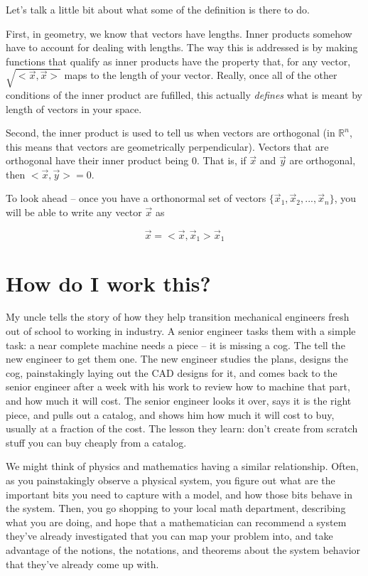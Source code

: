 \documentclass[
]{book}
\begin{document}
Let's talk a little bit about what some of the definition is there to do.

First, in geometry, we know that vectors have lengths. Inner products somehow have to account for dealing with lengths. The way this is addressed is by making functions that qualify as inner products have the property that, for any vector, \(\sqrt{<\vec{x},\vec{x}>}\) maps to the length of your vector. Really, once all of the other conditions of the inner product are fufilled, this actually \emph{defines} what is meant by length of vectors in your space.

Second, the inner product is used to tell us when vectors are orthogonal (in \(\mathbb{R}^n\), this means that vectors are geometrically perpendicular). Vectors that are orthogonal have their inner product being 0. That is, if \(\vec{x}\) and \(\vec{y}\) are orthogonal, then \(<\vec{x},\vec{y}> = 0\).

To look ahead -- once you have a orthonormal set of vectors \(\{\vec{x}_{1},\vec{x}_{2}, ..., \vec{x}_{n}\}\), you will be able to write any vector \(\vec{x}\) as

\[\vec{x} = <\vec{x}, \vec{x}_{1}> \vec{x}_{1} \]

\hypertarget{how-do-i-work-this}{%
\chapter{How do I work this?}\label{how-do-i-work-this}}

My uncle tells the story of how they help transition mechanical engineers fresh out of school to working in industry. A senior engineer tasks them with a simple task: a near complete machine needs a piece -- it is missing a cog. The tell the new engineer to get them one. The new engineer studies the plans, designs the cog, painstakingly laying out the CAD designs for it, and comes back to the senior engineer after a week with his work to review how to machine that part, and how much it will cost. The senior engineer looks it over, says it is the right piece, and pulls out a catalog, and shows him how much it will cost to buy, usually at a fraction of the cost. The lesson they learn: don't create from scratch stuff you can buy cheaply from a catalog.

We might think of physics and mathematics having a similar relationship. Often, as you painstakingly observe a physical system, you figure out what are the important bits you need to capture with a model, and how those bits behave in the system. Then, you go shopping to your local math department, describing what you are doing, and hope that a mathematician can recommend a system they've already investigated that you can map your problem into, and take advantage of the notions, the notations, and theorems about the system behavior that they've already come up with.
\end{document}
